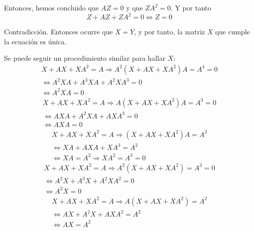 \documentclass[../../main.tex]{subfiles}
\begin{document}
  Entonces, hemos concluido que $A Z = 0$ y que $Z A^2 = 0$. Y por tanto
  $$
  Z + A Z + Z A^2 = 0 \iff Z = 0
  $$

  Contradicción. Entonces ocurre que $X = Y$, y por tanto, la matriz $X$ que cumple la ecuación es única.

  Se puede seguir un procedimiento similar para hallar $X$:
  \begin{equation*}
    \begin{split}
      X + A X + X A^2 = A \Longrightarrow
      A^2 (X + A X + X A^2) A = A^4 = 0 \\ \iff
      A^2 X A + A^3 X A + A^2 X A^3 = 0 \\ \iff
      A^2 X A = 0
    \end{split}
  \end{equation*}
  \begin{equation*}
    \begin{split}
      X + A X + X A^2 = A \Longrightarrow
      A (X + A X + X A^2) A = A^3 = 0 \\ \iff
      A X A + A^2 X A + A X A^3 = 0 \\ \iff
      A X A = 0
    \end{split}
  \end{equation*}
  \begin{equation*}
    \begin{split}
      X + A X + X A^2 = A \Longrightarrow
      (X + A X + X A^2) A = A^2 \\ \iff
      X A + A X A + X A^3 = A^2 \\ \iff
      X A = A^2 \Longrightarrow X A^2 = A^3 = 0
    \end{split}
  \end{equation*}
  \begin{equation*}
    \begin{split}
      X + A X + X A^2 = A \Longrightarrow
      A^2 (X + A X + X A^2) = A^3 = 0 \\ \iff
      A^2 X + A^3 X + A^2 X A^2 = 0 \\ \iff
      A^2 X = 0
    \end{split}
  \end{equation*}
  \begin{equation*}
    \begin{split}
      X + A X + X A^2 = A \Longrightarrow
      A (X + A X + X A^2) = A^2 \\ \iff
      A X + A^2 X + A X A^2 = A^2 \\ \iff
      A X = A^2
    \end{split}
  \end{equation*}
\end{document}
